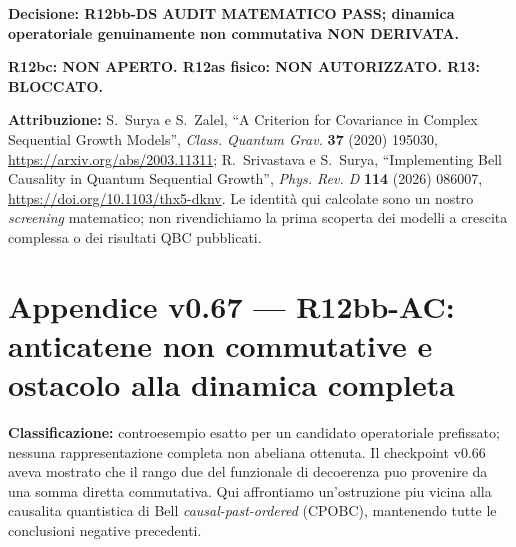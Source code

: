 \documentclass[11pt,a4paper]{article}
\begin{document}
\textbf{Decisione: R12bb-DS AUDIT MATEMATICO PASS; dinamica operatoriale genuinamente non commutativa NON DERIVATA.}

\textbf{R12bc: NON APERTO. R12as fisico: NON AUTORIZZATO. R13: BLOCCATO.}

\textbf{Attribuzione:} S.~Surya e S.~Zalel, ``A Criterion for Covariance in Complex Sequential Growth Models'', \emph{Class. Quantum Grav.} \textbf{37} (2020) 195030, \url{https://arxiv.org/abs/2003.11311}; R.~Srivastava e S.~Surya, ``Implementing Bell Causality in Quantum Sequential Growth'', \emph{Phys. Rev. D} \textbf{114} (2026) 086007, \url{https://doi.org/10.1103/thx5-dknv}. Le identit\`a qui calcolate sono un nostro \emph{screening} matematico; non rivendichiamo la prima scoperta dei modelli a crescita complessa o dei risultati QBC pubblicati.




\clearpage
\section*{Appendice v0.67 --- R12bb-AC: anticatene non commutative e ostacolo alla dinamica completa}
\textbf{Classificazione:} controesempio esatto per un candidato operatoriale prefissato; nessuna rappresentazione completa non abeliana ottenuta. Il checkpoint v0.66 aveva mostrato che il rango due del funzionale di decoerenza puo provenire da una somma diretta commutativa. Qui affrontiamo un'ostruzione piu vicina alla causalita quantistica di Bell \emph{causal-past-ordered} (CPOBC), mantenendo tutte le conclusioni negative precedenti.
\end{document}
